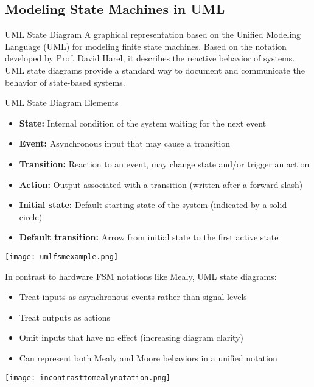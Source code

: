 \subsection{Modeling State Machines in UML}

\begin{definition}{UML State Diagram}
A graphical representation based on the Unified Modeling Language (UML) for modeling finite state machines. Based on the notation developed by Prof. David Harel, it describes the reactive behavior of systems. UML state diagrams provide a standard way to document and communicate the behavior of state-based systems.
\end{definition}

\begin{concept}{UML State Diagram Elements}
\begin{itemize}
    \item \textbf{State:} Internal condition of the system waiting for the next event
    \item \textbf{Event:} Asynchronous input that may cause a transition
    \item \textbf{Transition:} Reaction to an event, may change state and/or trigger an action
    \item \textbf{Action:} Output associated with a transition (written after a forward slash)
    \item \textbf{Initial state:} Default starting state of the system (indicated by a solid circle)
    \item \textbf{Default transition:} Arrow from initial state to the first active state
\end{itemize}
\texttt{[image: umlfsmexample.png]}

In contrast to hardware FSM notations like Mealy, UML state diagrams:
\begin{itemize}
    \item Treat inputs as asynchronous events rather than signal levels
    \item Treat outputs as actions
    \item Omit inputs that have no effect (increasing diagram clarity)
    \item Can represent both Mealy and Moore behaviors in a unified notation
\end{itemize}
\texttt{[image: incontrasttomealynotation.png]}
\end{concept}

